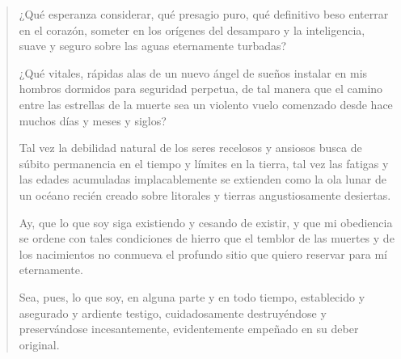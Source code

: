 \documentclass[12pt]{article}
\begin{document}
\clearpage
{}
\begin{verse}
¿Qué esperanza considerar, qué presagio puro,  
qué definitivo beso enterrar en el corazón,  
someter en los orígenes del desamparo y la inteligencia,  
suave y seguro sobre las aguas eternamente turbadas?  
	
¿Qué vitales, rápidas alas de un nuevo ángel de sueños  
instalar en mis hombros dormidos para seguridad perpetua,  
de tal manera que el camino entre las estrellas de la muerte  
sea un violento vuelo comenzado desde hace muchos días y meses y siglos?  
	
Tal vez la debilidad natural de los seres recelosos y ansiosos  
busca de súbito permanencia en el tiempo y límites en la tierra,  
tal vez las fatigas y las edades acumuladas implacablemente  
se extienden como la ola lunar de un océano recién creado  
sobre litorales y tierras angustiosamente desiertas.  
	
Ay, que lo que soy siga existiendo y cesando de existir,  
y que mi obediencia se ordene con tales condiciones de hierro  
que el temblor de las muertes y de los nacimientos no conmueva  
el profundo sitio que quiero reservar para mí eternamente.  
	
Sea, pues, lo que soy, en alguna parte y en todo tiempo,  
establecido y asegurado y ardiente testigo,  
cuidadosamente destruyéndose y preservándose incesantemente,  
evidentemente empeñado en su deber original.

\end{verse}
\end{document}
